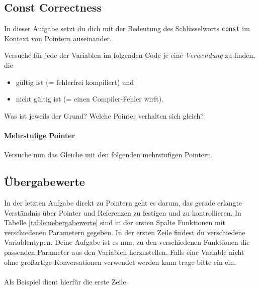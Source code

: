 \subsection{Const Correctness}

In dieser Aufgabe setzt du dich mit der Bedeutung des Schlüsselworts \lstinline{const} im Kontext von Pointern auseinander.

Versuche für jede der Variablen im folgenden Code je eine \emph{Verwendung} zu finden, die  
\begin{itemize}
\item gültig ist (= fehlerfrei kompiliert) und
\item nicht gültig ist (= einen Compiler-Fehler wirft).
\end{itemize}


Was ist jeweils der Grund?
Welche Pointer verhalten sich gleich?



\paragraph{Mehrstufige Pointer}

Versuche nun das Gleiche mit den folgenden mehrstufigen Pointern.



\subsection{Übergabewerte}
In der letzten Aufgabe direkt zu Pointern geht es darum, das gerade erlangte Verständnis über Pointer und Referenzen zu festigen und zu kontrollieren.
In Tabelle \ref{table:uebergabewerte} sind in der ersten Spalte Funktionen mit verschiedenen Parametern gegeben.
In der ersten Zeile findest du verschiedene Variablentypen.
Deine Aufgabe ist es nun, zu den verschiedenen Funktionen die passenden Parameter aus den Variablen herzustellen.
Falls eine Variable nicht ohne großartige Konversationen verwendet werden kann trage bitte ein \xmark ein. \\\\
Als Beispiel dient hierfür die erste Zeile. 

